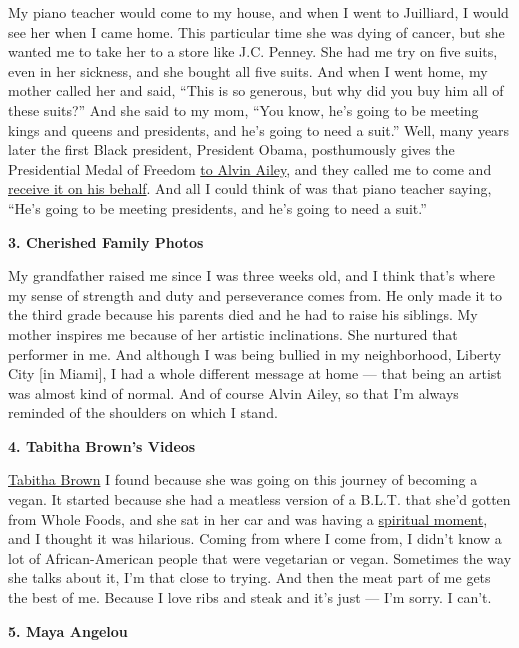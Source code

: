 My piano teacher would come to my house, and when I went to Juilliard, I
would see her when I came home. This particular time she was dying of
cancer, but she wanted me to take her to a store like J.C. Penney. She
had me try on five suits, even in her sickness, and she bought all five
suits. And when I went home, my mother called her and said, ``This is so
generous, but why did you buy him all of these suits?'' And she said to
my mom, ``You know, he's going to be meeting kings and queens and
presidents, and he's going to need a suit.'' Well, many years later the
first Black president, President Obama, posthumously gives the
Presidential Medal of Freedom
\href{https://www.youtube.com/watch?v=Hvr0ZYYLmuw\&list=ULi9SliUpD0og\&index=60\&app=desktop}{to
Alvin Ailey}, and they called me to come and
\href{https://www.youtube.com/watch?v=-_EaZCqnbWc}{receive it on his
behalf}. And all I could think of was that piano teacher saying, ``He's
going to be meeting presidents, and he's going to need a suit.''

\textbf{3. Cherished Family Photos}

My grandfather raised me since I was three weeks old, and I think that's
where my sense of strength and duty and perseverance comes from. He only
made it to the third grade because his parents died and he had to raise
his siblings. My mother inspires me because of her artistic
inclinations. She nurtured that performer in me. And although I was
being bullied in my neighborhood, Liberty City {[}in Miami{]}, I had a
whole different message at home --- that being an artist was almost kind
of normal. And of course Alvin Ailey, so that I'm always reminded of the
shoulders on which I stand.

\textbf{4. Tabitha Brown's Videos}

\href{https://www.youtube.com/watch?v=tM0NAZ2ruCA}{Tabitha Brown} I
found because she was going on this journey of becoming a vegan. It
started because she had a meatless version of a B.L.T. that she'd gotten
from Whole Foods, and she sat in her car and was having a
\href{https://www.youtube.com/watch?v=AP1mnFJG0-s}{spiritual moment},
and I thought it was hilarious. Coming from where I come from, I didn't
know a lot of African-American people that were vegetarian or vegan.
Sometimes the way she talks about it, I'm that close to trying. And then
the meat part of me gets the best of me. Because I love ribs and steak
and it's just --- I'm sorry. I can't.

\textbf{5. Maya Angelou}

